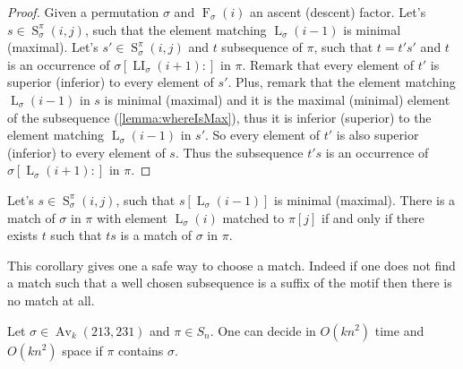 \documentclass[a4paper]{llncs}
\DeclareMathOperator{\AV}{Av}
\newcommand{\ptext}{\pi}
\newcommand{\pmotif}{\sigma}
\DeclareMathOperator{\firsta}{L}
\newcommand{\first}[2]{\firsta_{{#1}}({#2})}
\DeclareMathOperator{\firstia}{LI}
\newcommand{\firsti}[2]{\firstia_{{#1}}({#2})}
\DeclareMathOperator{\factora}{F}
\newcommand{\factor}[2]{\factora_{{#1}}({#2})}
\DeclareMathOperator{\SETa}{S}
\newcommand{\SET}[4]{\SETa_{{#1}}^{{#2}}({#3},{#4})}
\begin{document}
\begin{proof}
Given a permutation $\pmotif$ and $\factor{\pmotif}{i}$ an ascent (descent) factor.
Let's $s \in \SET{\pmotif}{\ptext}{i}{j}$, such that the element matching $\first{\pmotif}{i-1}$ is minimal (maximal).
Let's $s' \in \SET{\pmotif}{\ptext}{i}{j}$ and $t$ subsequence of $\ptext$, such that $t=t's'$ and $t$ is an occurrence of $\pmotif[\firsti{\pmotif}{i+1}:]$ in $\pi$. 
Remark that every element of $t'$ is superior (inferior) to every element of $s'$.
Plus, remark that the element matching $\first{\pmotif}{i-1}$ in $s$ is minimal (maximal) and it is the maximal (minimal) element of the subsequence (\ref{lemma:whereIsMax}), thus
it is inferior (superior) to the element matching $\first{\pmotif}{i-1}$ in $s'$.
So every element of $t'$ is also superior (inferior) to every element of $s$. Thus the subsequence $t's$ is an occurrence of $\pmotif[\first{\pmotif}{i+1}:]$ in $\ptext$.
\end{proof}

\begin{corollary}
Let's $s \in \SET{\pmotif}{\ptext}{i}{j}$, such that $s[\first{\pmotif}{i-1}]$ is minimal (maximal). There is a match of $\pmotif$ in $\ptext$ with element $\first{\pmotif}{i}$ matched to $\ptext[j]$ if and only if there exists $t$ such that $ts$ is a match of $\pmotif$ in $\ptext$. 
\end{corollary}

This corollary gives one a safe way to choose a match. Indeed if one does not find a match such that a well chosen subsequence is a suffix of the motif then there is no match at all.

\begin{proposition}
	\label{Proposition:sigma avoids 213 and 231}
	Let $\sigma \in \AV_k(213,231)$ and $\pi \in S_n$.
	One can decide in $O(kn^2)$ time
	and $O(kn^2)$ space if $\pi$ contains $\sigma$.
\end{proposition}

\end{document}
